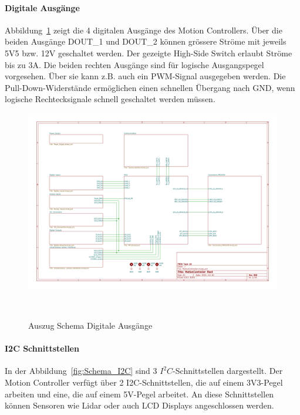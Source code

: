 \documentclass[main.  tex]{subfiles} %
\begin{document}
\newpage

\paragraph{Digitale Ausgänge}
Abbildung~\ref{fig:Schema_DOut} zeigt die 4 digitalen Ausgänge des Motion
Controllers. Über die beiden Ausgänge DOUT\_1 und DOUT\_2 können grössere
Ströme mit jeweils 5V5 bzw. 12V geschaltet werden. Der gezeigte High-Side
Switch erlaubt Ströme bis zu 3A. Die beiden rechten Ausgänge sind für logische
Ausgangspegel vorgesehen. Über sie kann z.B. auch ein PWM-Signal ausgegeben
werden. Die Pull-Down-Widerstände ermöglichen einen schnellen Übergang nach
GND, wenn logische Rechtecksignale schnell geschaltet werden müssen.

\begin{figure}[H]
    \centering
    \includegraphics[page=8,width=\textwidth]{../Anhang_pdfs/MotionController.pdf}
    \caption{Auszug Schema Digitale Ausgänge}~\label{fig:Schema_DOut}
\end{figure}

\newpage

\paragraph{I2C Schnittstellen}
In der Abbildung~\ref{fig:Schema_I2C} sind 3 $I^2C$-Schnittstellen dargestellt.
Der Motion Controller verfügt über 2 I2C-Schnittstellen, die auf einem
3V3-Pegel arbeiten und eine, die auf einem 5V-Pegel arbeitet. An diese
Schnittstellen können Sensoren wie Lidar oder auch LCD Displays angeschlossen
werden.
\end{document}
